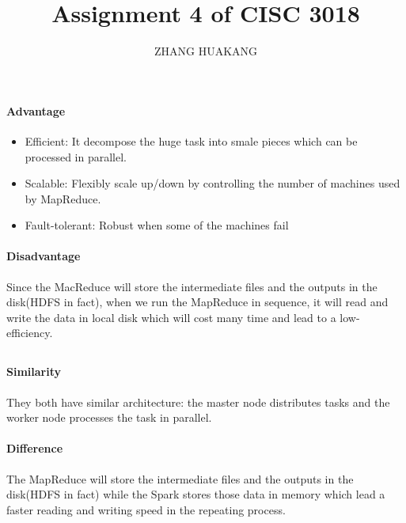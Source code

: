 \documentclass{article}
\title{Assignment 4 of CISC 3018}
\author{ZHANG HUAKANG}
\begin{document}
    \maketitle
    \section{}
        \subsection{}
            \paragraph{Advantage}
            \begin{itemize}
                \item Efficient: It decompose the huge task into smale pieces which can be processed in parallel.
                \item Scalable:  Flexibly scale up/down by controlling the number of machines used by MapReduce.
                \item Fault-tolerant: Robust when some of the machines fail
            \end{itemize}
            \paragraph{Disadvantage}
            Since the MacReduce will store the intermediate files and the outputs in the disk(HDFS in fact), when we run the MapReduce in sequence, it will read and write the data in local disk which will cost many time and lead to a low-efficiency.
        \subsection{}
            \paragraph{Similarity}
            They both have similar architecture: the master node distributes tasks and the worker node processes the task in parallel. 
            \paragraph{Difference}
            The MapReduce will store the intermediate files and the outputs in the disk(HDFS in fact) while the Spark stores those data in memory which lead a faster reading and writing speed in the repeating process.
\end{document}
